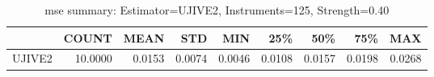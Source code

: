 \begin{table}[ht]
\centering
\caption{mse summary: Estimator=UJIVE2, Instruments=125, Strength=0.40}
\begin{tabular}{lrrrrrrrr}
\toprule
 & COUNT & MEAN & STD & MIN & 25\% & 50\% & 75\% & MAX \\
\midrule
UJIVE2 & 10.0000 & 0.0153 & 0.0074 & 0.0046 & 0.0108 & 0.0157 & 0.0198 & 0.0268 \\
\bottomrule
\end{tabular}
\end{table}
